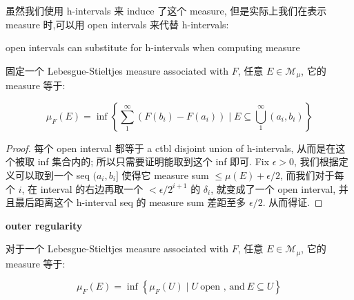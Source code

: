 \documentclass{qlnotes-export}
\begin{document}
虽然我们使用 h-intervals 来 induce 了这个 measure, 但是实际上我们在表示 measure 时,可以用 open intervals 来代替 h-intervals:

\begin{lemma}{open intervals can substitute for h-intervals when computing measure}\label{lem-03-distribution-function-lebesgue-stieltjes-measures-open-intervals-can-substitute-for-h-intervals-when-computing-mea}

固定一个 Lebesgue-Stieltjes measure associated with \(F\), 任意 \(E \in \mathcal{M}_{\mu}\), 它的 measure 等于:

\[\mu_{F}(E) = \inf\left\{ {\sum\limits_{1}^{\infty}(F(b_{i}) - F(a_{i})) \mid E \subseteq \bigcup\limits_{1}^{\infty}(a_{i},b_{i})} \right\}\]

\end{lemma}

\begin{proof}

每个 open interval 都等于 a ctbl disjoint union of h-intervals, 从而是在这个被取 inf 集合内的; 所以只需要证明能取到这个 inf 即可. Fix \(\epsilon > 0\), 我们根据定义可以取到一个 seq \((a_{i},b_{i}\rbrack\) 使得它 measure sum \(\leq \mu(E) + \epsilon/2\), 而我们对于每个 \(i\), 在 interval 的右边再取一个 \(< \epsilon/2^{i + 1}\) 的 \(\delta_{i}\), 就变成了一个 open interval, 并且最后距离这个 h-interval seq 的 measure sum 差距至多 \(\epsilon/2\). 从而得证.

\end{proof}

\begin{theorem}{\textbf{outer regularity}}\label{thm-03-distribution-function-lebesgue-stieltjes-measures-outer-regularity}

对于一个 Lebesgue-Stieltjes measure associated with \(F\), 任意 \(E \in \mathcal{M}_{\mu}\), 它的 measure 等于:

\[\mu_{F}(E) = \inf\left\{ {\mu_{F}(U) \mid U\ \text{open , and}\ E \subseteq U} \right\}\]

\end{theorem}
\end{document}

